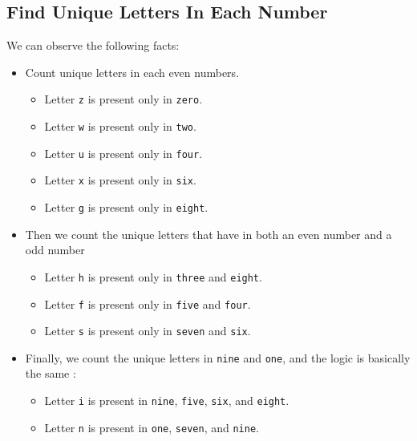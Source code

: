 \subsection{Find Unique Letters In Each Number}
We can observe the following facts:
\begin{itemize}
\item Count unique letters in each even numbers.
\begin{itemize}
\item Letter \texttt{z} is present only in \texttt{zero}.
\item Letter \texttt{w} is present only in \texttt{two}.
\item Letter \texttt{u} is present only in \texttt{four}.
\item Letter \texttt{x} is present only in \texttt{six}.
\item Letter \texttt{g} is present only in \texttt{eight}.
\end{itemize}
\item Then we count the unique letters that have in both an even number and a odd number 

\begin{itemize}
\item Letter \texttt{h} is present only in \texttt{three} and \texttt{eight}.
\item Letter \texttt{f} is present only in \texttt{five} and \texttt{four}.
\item Letter \texttt{s} is present only in \texttt{seven} and \texttt{six}.
\end{itemize}

\item Finally, we count the unique letters in \texttt{nine} and \texttt{one}, and the logic is basically the same :
\begin{itemize}
\item Letter \texttt{i} is present in \texttt{nine}, \texttt{five}, \texttt{six}, and \texttt{eight}.
\item Letter \texttt{n} is present in \texttt{one}, \texttt{seven}, and \texttt{nine}.
\end{itemize}

\end{itemize}

